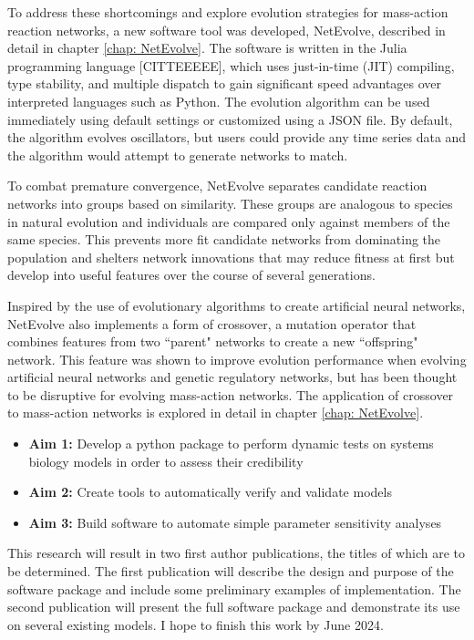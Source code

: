 \documentclass[12pt]{report}
\begin{document}
To address these shortcomings and explore evolution strategies for mass-action reaction networks, a new software tool was developed, NetEvolve, described in detail in chapter \ref{chap: NetEvolve}. The software is written in the Julia programming language [CITTEEEEE], which uses just-in-time (JIT) compiling, type stability, and multiple dispatch to gain significant speed advantages over interpreted languages such as Python. The evolution algorithm can be used immediately using default settings or customized using a JSON file. By default, the algorithm evolves oscillators, but users could provide any time series data and the algorithm would attempt to generate networks to match. 

To combat premature convergence, NetEvolve separates candidate reaction networks into groups based on similarity. These groups are analogous to species in natural evolution and individuals are compared only against members of the same species. This prevents more fit candidate networks from dominating the population and shelters network innovations that may reduce fitness at first but develop into useful features over the course of several generations. 

Inspired by the use of evolutionary algorithms to create artificial neural networks, NetEvolve also implements a form of crossover, a mutation operator that combines features from two ``parent" networks to create a new ``offspring" network. This feature was shown to improve evolution performance when evolving artificial neural networks and genetic regulatory networks, but has been thought to be disruptive for evolving mass-action networks. The application of crossover to mass-action networks is explored in detail in chapter \ref{chap: NetEvolve}.

\begin{itemize}
\item\textbf{Aim 1:} Develop a python package to perform dynamic tests on systems biology models in order to assess their credibility
\item\textbf{Aim 2:} Create tools to automatically verify and validate models
\item\textbf{Aim 3:} Build software to automate simple parameter sensitivity analyses
\end{itemize}

This research will result in two first author publications, the titles of which are to be determined. The first publication will describe the design and purpose of the software package and include some preliminary examples of implementation. The second publication will present the full software package and demonstrate its use on several existing models. I hope to finish this work by June 2024.
\end{document}
